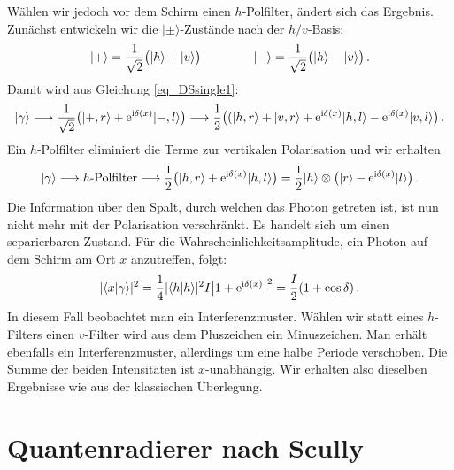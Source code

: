 W\"ahlen wir jedoch vor dem Schirm einen $h$-Polfilter, \"andert sich das Ergebnis.
Zun\"achst entwickeln wir die $|\pm\rangle$-Zust\"ande nach der $h/v$-Basis:
\begin{equation}
        |+\rangle = \frac{1}{\sqrt{2}} \big( |h\rangle  + |v\rangle \big) \hspace{1.5cm}
        | - \rangle = \frac{1}{\sqrt{2}} \big( |h\rangle  - |v\rangle \big) \, .
\end{equation}
Damit wird aus Gleichung \ref{eq_DSsingle1}:
\begin{equation}
          | \gamma \rangle \longrightarrow  \frac{1}{\sqrt{2}} \big(  |+ , r\rangle + {\rm e}^{{\rm i}\delta(x)} |- , l\rangle \big)  
        \longrightarrow
          \frac{1}{2} \big( ( |h , r\rangle + |v , r\rangle   + {\rm e}^{{\rm i}\delta(x)} | h , l\rangle 
                                          - {\rm e}^{{\rm i}\delta(x)}|v , l\rangle  \big) \, .  
\end{equation}
Ein $h$-Polfilter eliminiert die Terme zur vertikalen Polarisation und wir erhalten
\begin{equation}
          |\gamma \rangle \longrightarrow  \mbox{$h$-Polfilter}
        \longrightarrow
          \frac{1}{2} \big( |h , r\rangle   + {\rm e}^{{\rm i}\delta(x)} | h , l\rangle  \big)
          =    \frac{1}{2}  |h \rangle \otimes \big( |r \rangle   - {\rm e}^{{\rm i}\delta(x)} | l\rangle  \big)  \, .  
\end{equation}
Die Information \"uber den Spalt, durch welchen das Photon getreten ist, ist nun nicht mehr
mit der Polarisation verschr\"ankt. Es handelt sich um einen separierbaren Zustand. F\"ur die
Wahrscheinlichkeitsamplitude, ein Photon auf dem Schirm am Ort $x$ anzutreffen, folgt:
\begin{equation}
      | \langle x  |\gamma \rangle |^2 
          =    \frac{1}{4} | \langle h |h \rangle|^2  I  \big| 1  + {\rm e}^{{\rm i}\delta(x)} \big|^2 
          = \frac{I}{2} ( 1 + \cos \delta)  \, .  
\end{equation}
In diesem Fall beobachtet man ein Interferenzmuster. W\"ahlen wir statt eines $h$-Filters einen
$v$-Filter wird aus dem Pluszeichen ein Minuszeichen. Man erh\"alt
ebenfalls ein Interferenzmuster, allerdings um eine halbe Periode verschoben. Die Summe
der beiden Intensit\"aten ist $x$-unabh\"angig. Wir erhalten also dieselben Ergebnisse wie aus
der klassischen \"Uberlegung.

\section{Quantenradierer nach Scully}
\label{sec_Scully}

